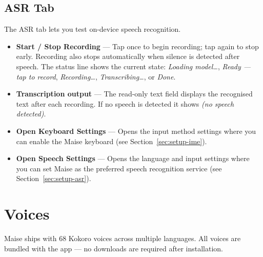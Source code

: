 \documentclass[12pt,a4paper]{article}
\begin{document}
\subsection{ASR Tab}

The ASR tab lets you test on-device speech recognition.

\begin{itemize}[noitemsep]
    \item \textbf{Start / Stop Recording} — Tap once to begin recording; tap again to stop early. Recording also stops automatically when silence is detected after speech. The status line shows the current state: \emph{Loading model\ldots}, \emph{Ready --- tap to record}, \emph{Recording\ldots}, \emph{Transcribing\ldots}, or \emph{Done}.
    \item \textbf{Transcription output} — The read-only text field displays the recognised text after each recording. If no speech is detected it shows \emph{(no speech detected)}.
    \item \textbf{Open Keyboard Settings} — Opens the input method settings where you can enable the Maise keyboard (see Section~\ref{sec:setup-ime}).
    \item \textbf{Open Speech Settings} — Opens the language and input settings where you can set Maise as the preferred speech recognition service (see Section~\ref{sec:setup-asr}).
\end{itemize}

\section{Voices}

Maise ships with 68 Kokoro voices across multiple languages. All voices are bundled with the app — no downloads are required after installation.
\end{document}
